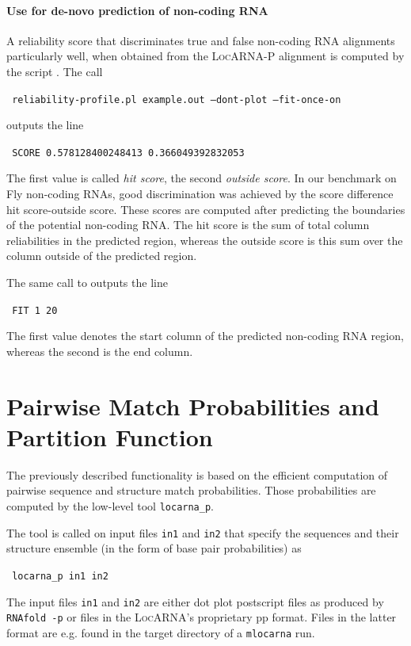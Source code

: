 \documentclass{article}
\newcommand{\LocARNA}{\textsc{LocARNA}}
\newcommand{\LocARNAP}{\textsc{LocARNA-P}}
\newenvironment{ttbox}{%
  \begin{framed}\begin{minipage}{1.0\textwidth}\tt}%
{\end{minipage}\end{framed}\noindent}
\begin{document}
\paragraph{Use for de-novo prediction of non-coding RNA}
A reliability score that discriminates true and false non-coding RNA
alignments particularly well, when obtained from the \LocARNAP{}
alignment is computed by the script .
The call
\begin{ttbox}
  reliability-profile.pl example.out --dont-plot --fit-once-on
\end{ttbox}
outputs the line
\begin{ttbox}
  SCORE 0.578128400248413 0.366049392832053
\end{ttbox}
The first value is called \emph{hit score}, the second \emph{outside
  score}. In our benchmark on Fly non-coding RNAs, good discrimination
was achieved by the score difference hit score-outside score. These
scores are computed after predicting the boundaries of the potential
non-coding RNA. The hit score is the sum of total column reliabilities
in the predicted region, whereas the outside score is this sum over
the column outside of the predicted region.

The same call to  outputs the line
\begin{ttbox}
  FIT 1 20
\end{ttbox}
The first value denotes the start column of the predicted non-coding
RNA region, whereas the second is the end column.

\section{Pairwise Match Probabilities and Partition Function}

The previously described functionality is based on the efficient
computation of pairwise sequence and structure match probabilities.
Those probabilities are computed by the low-level tool
\texttt{locarna\_p}.

The tool is called on input files \texttt{in1} and \texttt{in2} that
specify the sequences and their structure ensemble (in the form of
base pair probabilities) as
\begin{ttbox}
  locarna\_p in1 in2
\end{ttbox}
The input files \texttt{in1} and \texttt{in2} are either dot plot
postscript files as produced by \texttt{RNAfold -p} or files in the
\LocARNA{}'s proprietary pp format. Files in the latter format are
e.g. found in the target directory of a \texttt{mlocarna} run.
\end{document}
